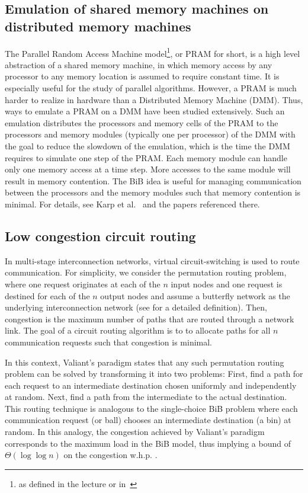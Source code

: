 \documentclass[a4paper,12pt]{article}
\begin{document}
\subsection{Emulation of shared memory machines on distributed memory machines}
\label{sec:DMM}
The Parallel Random Access Machine model\footnote{as defined in the lecture or in~\cite{P03}}, or PRAM for short, is a high level abstraction of a shared memory machine, in which memory access by any processor to any memory location is assumed to require constant time. It is especially useful for the study of parallel algorithms. However, a PRAM is much harder to realize in hardware than a Distributed Memory Machine (DMM). Thus, ways to emulate a PRAM on a DMM have been studied extensively. Such an emulation distributes the processors and memory cells of the PRAM to the processors and memory modules (typically one per processor) of the DMM with the goal to reduce the slowdown of the emulation, which is the time the DMM requires to simulate one step of the PRAM. Each memory module can handle only one memory access at a time step. More accesses to the same module will result in memory contention. The BiB idea is useful for managing communication between the processors and the memory modules such that memory contention is minimal. For details, see Karp et al.~\cite{KLM92} and the papers referenced there. 
 
\subsection{Low congestion circuit routing}
\label{sec:circuitrouting}
In multi-stage interconnection networks, virtual circuit-switching is used to route communication. For simplicity, we consider the permutation routing problem, where one request originates at each of the $n$ input nodes and one request is destined for each of the $n$ output nodes and assume a butterfly network as the underlying interconnection network (see \cite{CLR09} for a detailed definition). Then, congestion is the maximum number of paths that are routed through a network link. The goal of a circuit routing algorithm is to to allocate paths for all $n$ communication requests such that congestion is minimal.

In this context, Valiant's paradigm \cite{V82} states that any such permutation routing problem can be solved by transforming it into two problems: First, find a path for each request to an intermediate destination chosen uniformly and independently at random. Next, find a path from the intermediate to the actual destination. This routing technique is analogous to the single-choice BiB problem where each communication request (or ball) chooses an intermediate destination (a bin) at random. In this analogy, the congestion achieved by Valiant's paradigm corresponds to the maximum load in the BiB model, thus implying a bound of $\Theta\left(\log \log n\right)$ on the congestion w.h.p. \cite{CMM+98} \cite{MRS01}. 
\end{document}
